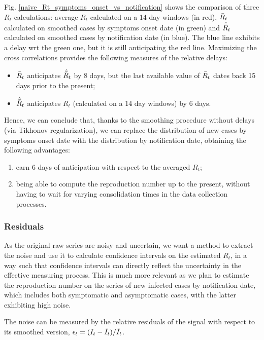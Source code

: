 \documentclass[graybox]{svmult}
\begin{document}
Fig. \ref{naive_Rt_symptoms_onset_vs_notification} shows the comparison of three $R_t$ calculations: average $R_t$ calculated on a 14 day windows (in red), $\Bar{R}_t$ calculated on smoothed cases by symptoms onset date (in green) and $\hat{\Bar{R}}_{t}$ calculated on smoothed cases by notification date (in blue). The blue line exhibits a delay wrt the green one, but it is still anticipating the red line. Maximizing the cross correlations provides the following measures of the relative delays:
\begin{itemize}
    \item $\Bar{R}_t$ anticipates $\hat{\Bar{R}}_{t}$ by 8 days, but the last available value of $\Bar{R}_t$ dates back 15 days prior to the present;
    \item $\hat{\Bar{R}}_{t}$ anticipates $R_t$ (calculated on a 14 day windows) by 6 days.
\end{itemize}

Hence, we can conclude that, thanks to the smoothing procedure without delays (via Tikhonov regularization), we can replace the distribution of new cases by symptoms onset date with the distribution by notification date, obtaining the following advantages:
\begin{enumerate}
    \item earn 6 days of anticipation with respect to the averaged $R_t$;
    \item being able to compute the reproduction number up to the present, without having to wait for varying consolidation times in the data collection processes.
\end{enumerate}

\subsubsection{Residuals}

As the original raw series are noisy and uncertain, we want a method to extract the noise and use it to calculate confidence intervals on the estimated $R_t$, in a way such that confidence intervals can directly reflect the uncertainty in the effective measuring process. This is much more relevant as we plan to estimate the reproduction number on the series of new infected cases by notification date, which includes both symptomatic and asymptomatic cases, with the latter exhibiting high noise.

The noise can be measured by the relative residuals of the signal with respect to its smoothed version, $\epsilon_t = (I_t - \Bar{I}_t)/\Bar{I}_t$.
\end{document}
